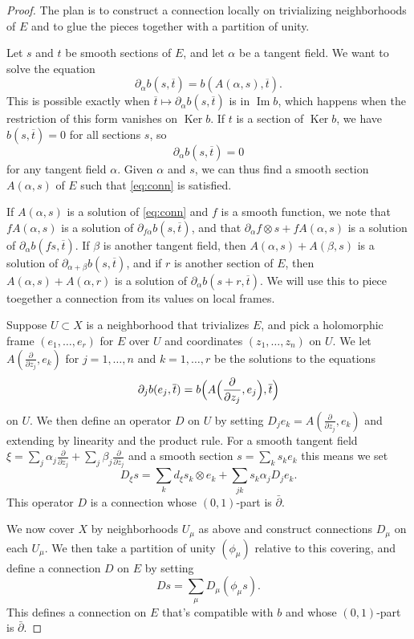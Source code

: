 \documentclass[10pt,a4paper]{article}
\newtheorem*{proof}{Proof}
\def\ov#1{\overline{#1}}
\DeclareMathOperator{\im}{Im}
\DeclareMathOperator{\Ker}{Ker}
\begin{document}
\begin{proof}
The plan is to construct a connection locally on trivializing neighborhoods of $E$ and to glue the pieces together with a partition of unity.

Let $s$ and $t$ be smooth sections of $E$, and let $\alpha$ be a tangent field. We want to solve the equation
\begin{equation}
\label{eq:conn}
\partial_\alpha b(s, \ov t)
= b(A(\alpha, s), \ov t).
\end{equation}
This is possible exactly when $\ov t \mapsto \partial_\alpha b(s, \ov t)$ is in $\im b$, which happens when the restriction of this form vanishes on $\Ker b$. If $t$ is a section of $\Ker b$, we have $b(s, \ov t) = 0$ for all sections $s$, so
\[
\partial_\alpha b(s, \ov t) = 0
\]
for any tangent field $\alpha$. Given $\alpha$ and $s$, we can thus find a smooth section $A(\alpha, s)$ of $E$ such that \eqref{eq:conn} is satisfied.

If $A(\alpha, s)$ is a solution of \eqref{eq:conn} and $f$ is a smooth function, we note that $f A(\alpha, s)$ is a solution of $\partial_{f\alpha} b(s, \ov t)$, and that $\partial_\alpha f \otimes s + f A(\alpha, s)$ is a solution of $\partial_\alpha b(fs, \ov t)$. If $\beta$ is another tangent field, then $A(\alpha,s) + A(\beta,s)$ is a solution of $\partial_{\alpha+\beta}b(s, \ov t)$, and if $r$ is another section of $E$, then $A(\alpha,s) + A(\alpha,r)$ is a solution of $\partial_\alpha b(s + r, \ov t)$. We will use this to piece toegether a connection from its values on local frames.

Suppose $U \subset X$ is a neighborhood that trivializes $E$, and pick a holomorphic frame $(e_1,\ldots,e_r)$ for $E$ over $U$ and coordinates $(z_1, \ldots, z_n)$ on $U$. We let $A(\frac{\partial}{\partial z_j}, e_k)$ for $j = 1, \ldots, n$ and $k = 1, \ldots, r$ be the solutions to the equations
\[
\partial_j b(e_j, \ov t)
= b\Bigl(A\Bigl(\frac{\partial}{\partial z_j}, e_j \Bigr), \ov t\Bigr)
\]
on $U$. We then define an operator $D$ on $U$ by setting $D_j e_k = A(\frac{\partial}{\partial z_j}, e_k)$ and extending by linearity and the product rule. For a smooth tangent field
\(
\xi
= \sum_j \alpha_j \frac{\partial}{\partial z_j}
+ \sum_j \beta_j \frac{\partial}{\partial \bar z_j}
\)
and a smooth section $s = \sum_k s_k e_k$ this means we set
\[
D_\xi s
= \sum_k d_\xi s_k \otimes e_k
+ \sum_{jk} s_k \alpha_j D_j e_k.
\]
This operator $D$ is a connection whose $(0,1)$-part is $\bar\partial$.

We now cover $X$ by neighborhoods $U_\mu$ as above and construct connections $D_\mu$ on each $U_\mu$. We then take a partition of unity $(\phi_\mu)$ relative to this covering, and define a connection $D$ on $E$ by setting
\[
D s = \sum_\mu D_\mu(\phi_\mu s).
\]
This defines a connection on $E$ that's compatible with $b$ and whose $(0,1)$-part is $\bar\partial$.
\end{proof}
\end{document}
